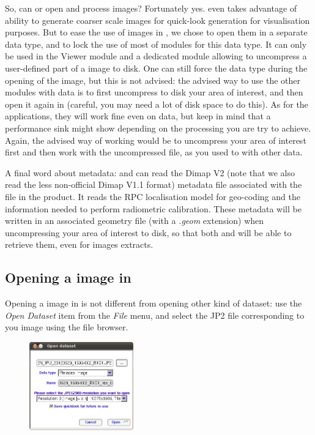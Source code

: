 So, can \mont or \app open and process \phr images? Fortunately
yes. \mont even takes advantage of \jpg ability to generate coarser
scale images for quick-look generation for visualisation purposes. But
to ease the use of \phr images in \mont, we chose to open them in a
separate data type, and to lock the use of most of modules for this
data type. It can only be used in the Viewer module and a dedicated
module allowing to uncompress a user-defined part of a
\phr image to disk. One can still force the data type during the
opening of the image, but this is not advised: the advised way to use
the other modules with \phr data is to first uncompress to disk
your area of interest, and then open it again in \mont (careful,
you may need a lot of disk space to do this). As for the applications,
they will work fine even on \jpg \phr data, but keep in mind
that a performance sink might show depending on the processing you are
try to achieve. Again, the advised way of working would be to
uncompress your area of interest first and then work with the
uncompressed file, as you used to with other data.

A final word about metadata: \app and \mont can read the Dimap V2
(note that we also read the less non-official Dimap V1.1 format)
metadata file associated with the \jpg file in the \phr
product. It reads the RPC localisation model for geo-coding and the
information needed to perform radiometric calibration. These metadata
will be written in an associated geometry file (with a \textit{.geom}
extension) when uncompressing your area of interest to disk, so that
both \mont and \app will be able to retrieve them, even for images
extracts.

\subsection{Opening a \phr image in \mont}

Opening a \phr image in \mont is not different from opening other
kind of dataset: use the \textit{Open Dataset} item from the
\textit{File} menu, and select the JP2 file corresponding to you image
using the file browser.

\begin{figure}
  \center
  \includegraphics[width=0.4\textwidth]{../Art/MonteverdiImages/pleiades_open.png}
  \label{fig:pleiades_open}
\end{figure}

